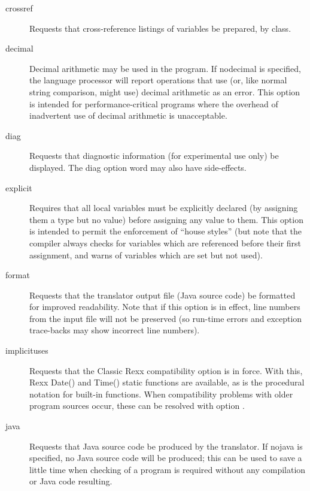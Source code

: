 \begin{description}
\item[crossref]
Requests that cross-reference listings of variables be prepared, by class.
\item[decimal]
Decimal arithmetic may be used in the program. If nodecimal is specified, the language processor will report operations that use (or, like normal string comparison, might use) decimal arithmetic as an error. This option is intended for performance-critical programs where the overhead of inadvertent use of decimal arithmetic is unacceptable.
\item[diag]
Requests that diagnostic information (for experimental use only) be displayed. The diag option word may also have side-effects.
\item[explicit]
Requires that all local variables must be explicitly declared (by assigning them a type but no value) before assigning any value to them. This option is intended to permit the enforcement of “house styles” (but note that the \nr{} compiler always checks for variables which are referenced before their first assignment, and warns of variables which are set but not used).
\item[format]
Requests that the translator output file (Java source code) be formatted for improved readability. Note that if this option is in effect, line numbers from the input file will not be preserved (so run-time errors and exception trace-backs may show incorrect line numbers).
\item[implicituses]
Requests that the Classic Rexx compatibility option is in force. With
this, Rexx Date() and Time() static functions are available, as is the
procedural notation for built-in functions. When compatibility
problems with older program sources occur, these can be resolved with
option .
\item[java]
Requests that Java source code be produced by the translator. If nojava is specified, no Java source code will be produced; this can be used to save a little time when checking of a program is required without any compilation or Java code resulting.

\end{description}
